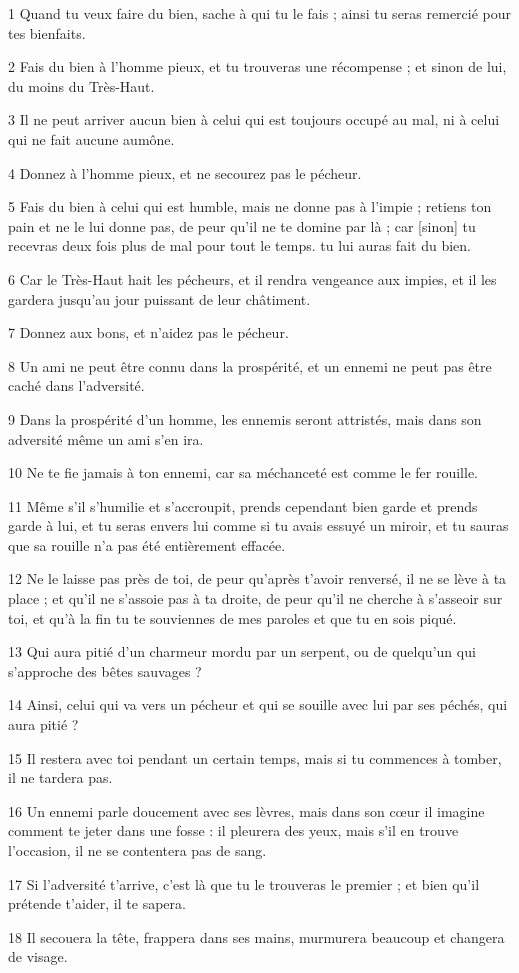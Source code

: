 
\par 1 Quand tu veux faire du bien, sache à qui tu le fais ; ainsi tu seras remercié pour tes bienfaits.
\par 2 Fais du bien à l'homme pieux, et tu trouveras une récompense ; et sinon de lui, du moins du Très-Haut.
\par 3 Il ne peut arriver aucun bien à celui qui est toujours occupé au mal, ni à celui qui ne fait aucune aumône.
\par 4 Donnez à l'homme pieux, et ne secourez pas le pécheur.
\par 5 Fais du bien à celui qui est humble, mais ne donne pas à l'impie ; retiens ton pain et ne le lui donne pas, de peur qu'il ne te domine par là ; car [sinon] tu recevras deux fois plus de mal pour tout le temps. tu lui auras fait du bien.
\par 6 Car le Très-Haut hait les pécheurs, et il rendra vengeance aux impies, et il les gardera jusqu'au jour puissant de leur châtiment.
\par 7 Donnez aux bons, et n'aidez pas le pécheur.
\par 8 Un ami ne peut être connu dans la prospérité, et un ennemi ne peut pas être caché dans l'adversité.
\par 9 Dans la prospérité d'un homme, les ennemis seront attristés, mais dans son adversité même un ami s'en ira.
\par 10 Ne te fie jamais à ton ennemi, car sa méchanceté est comme le fer rouille.
\par 11 Même s'il s'humilie et s'accroupit, prends cependant bien garde et prends garde à lui, et tu seras envers lui comme si tu avais essuyé un miroir, et tu sauras que sa rouille n'a pas été entièrement effacée.
\par 12 Ne le laisse pas près de toi, de peur qu'après t'avoir renversé, il ne se lève à ta place ; et qu'il ne s'assoie pas à ta droite, de peur qu'il ne cherche à s'asseoir sur toi, et qu'à la fin tu te souviennes de mes paroles et que tu en sois piqué.
\par 13 Qui aura pitié d'un charmeur mordu par un serpent, ou de quelqu'un qui s'approche des bêtes sauvages ?
\par 14 Ainsi, celui qui va vers un pécheur et qui se souille avec lui par ses péchés, qui aura pitié ?
\par 15 Il restera avec toi pendant un certain temps, mais si tu commences à tomber, il ne tardera pas.
\par 16 Un ennemi parle doucement avec ses lèvres, mais dans son cœur il imagine comment te jeter dans une fosse : il pleurera des yeux, mais s'il en trouve l'occasion, il ne se contentera pas de sang.
\par 17 Si l'adversité t'arrive, c'est là que tu le trouveras le premier ; et bien qu'il prétende t'aider, il te sapera.
\par 18 Il secouera la tête, frappera dans ses mains, murmurera beaucoup et changera de visage.

